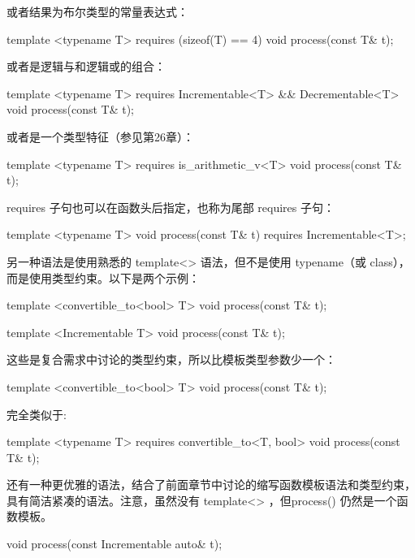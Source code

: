 或者结果为布尔类型的常量表达式：

\begin{cpp}
template <typename T> requires (sizeof(T) == 4)
void process(const T& t);
\end{cpp}

或者是逻辑与和逻辑或的组合：

\begin{cpp}
template <typename T> requires Incrementable<T> && Decrementable<T>
void process(const T& t);
\end{cpp}

或者是一个类型特征（参见第26章）：

\begin{cpp}
template <typename T> requires is_arithmetic_v<T>
void process(const T& t);
\end{cpp}

requires 子句也可以在函数头后指定，也称为尾部 requires 子句：

\begin{cpp}
template <typename T>
void process(const T& t) requires Incrementable<T>;
\end{cpp}

另一种语法是使用熟悉的 template<> 语法，但不是使用 typename（或 class），而是使用类型约束。以下是两个示例：

\begin{cpp}
template <convertible_to<bool> T>
void process(const T& t);

template <Incrementable T>
void process(const T& t);
\end{cpp}

这些是复合需求中讨论的类型约束，所以比模板类型参数少一个：

\begin{cpp}
template <convertible_to<bool> T>
void process(const T& t);
\end{cpp}

完全类似于:

\begin{cpp}
template <typename T> requires convertible_to<T, bool>
void process(const T& t);
\end{cpp}

还有一种更优雅的语法，结合了前面章节中讨论的缩写函数模板语法和类型约束，具有简洁紧凑的语法。注意，虽然没有 template<> ，但process() 仍然是一个函数模板。

\begin{cpp}
void process(const Incrementable auto& t);
\end{cpp}

